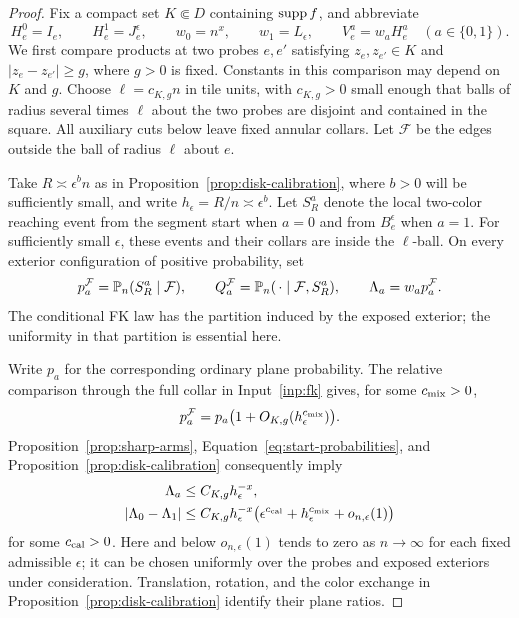 \begin{proof}
Fix a compact set $K\Subset D$ containing $\operatorname{supp} f$, and abbreviate
\[
 H_e^0=I_e,\qquad H_e^1=J_e^\epsilon,
 \qquad w_0=n^x,\qquad w_1=L_\epsilon,
 \qquad V_e^a=w_aH_e^a\quad(a\in\{0,1\}).
\]
We first compare products at two probes $e,e'$ satisfying
$z_e,z_{e'}\in K$ and $|z_e-z_{e'}|\ge g$, where $g>0$ is fixed.
Constants in this comparison may depend on $K$ and $g$.  Choose
$\ell=c_{K,g}n$ in tile units, with $c_{K,g}>0$ small enough that
balls of radius several times $\ell$ about the two probes are disjoint
and contained in the square.  All auxiliary cuts below leave fixed
annular collars.  Let $\mathcal F$ be the edges outside the ball of
radius $\ell$ about $e$.

Take $R\asymp\epsilon^b n$ as in
Proposition~\ref{prop:disk-calibration}, where $b>0$ will be sufficiently
small, and write $h_\epsilon=R/n\asymp\epsilon^b$.
Let $S_R^a$ denote the local two-color reaching event from the segment
start when $a=0$ and from $B_e^\epsilon$ when $a=1$.  For sufficiently
small $\epsilon$, these events and their collars are inside the
$\ell$-ball.  On every exterior configuration of positive probability,
set
\[
 p_a^{\mathcal F}=\mathbb P_n(S_R^a\mid\mathcal F),
 \qquad
 Q_a^{\mathcal F}=\mathbb P_n(\,\cdot\mid\mathcal F,S_R^a),
 \qquad \Lambda_a=w_ap_a^{\mathcal F}.
\]
The conditional FK law has the partition induced by the exposed
exterior; the uniformity in that partition is essential here.

Write $p_a$ for the corresponding ordinary plane probability.  The
relative comparison through the full collar in Input~\ref{inp:fk}
gives, for some $c_{\rm mix}>0$,
\begin{equation}
 p_a^{\mathcal F}=p_a
       \bigl(1+O_{K,g}(h_\epsilon^{c_{\rm mix}})\bigr).
 \label{eq:occupation-relative-comparison}
\end{equation}
Proposition~\ref{prop:sharp-arms}, Equation~\eqref{eq:start-probabilities},
and Proposition~\ref{prop:disk-calibration} consequently imply
\begin{align}
 \Lambda_a&\le C_{K,g}h_\epsilon^{-x},
 \label{eq:occupation-lambda-bound}\\
 |\Lambda_0-\Lambda_1|
 &\le C_{K,g}h_\epsilon^{-x}
 \bigl(\epsilon^{c_{\rm cal}}
          +h_\epsilon^{c_{\rm mix}}+o_{n,\epsilon}(1)\bigr)
 \label{eq:occupation-lambda-difference}
\end{align}
for some $c_{\rm cal}>0$.  Here and below $o_{n,\epsilon}(1)$ tends to
zero as $n\to\infty$ for each fixed admissible $\epsilon$; it can be
chosen uniformly over the probes and exposed exteriors under
consideration.  Translation, rotation, and the color exchange in
Proposition~\ref{prop:disk-calibration} identify their plane ratios.


\end{proof}
